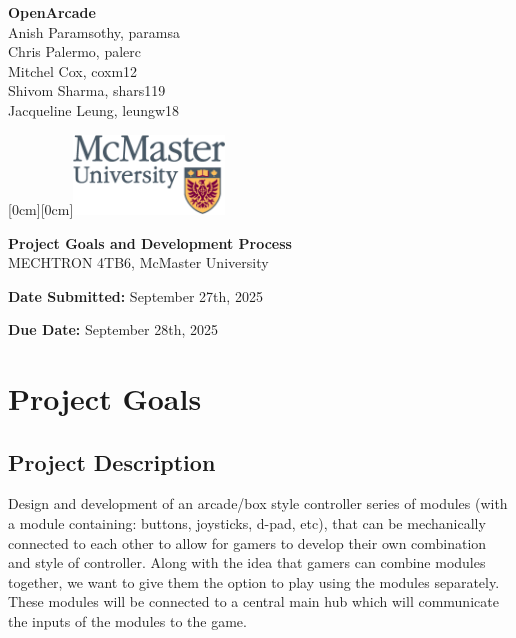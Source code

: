 \documentclass[a4]{article}
\date{\today}
\begin{document}
\begin{titlepage}

    \hspace*{0mm}\textbf{\Large OpenArcade}\\
    \hspace*{0mm} \large Anish Paramsothy, paramsa\\
    \hspace*{0mm} \large Chris Palermo, palerc\\
    \hspace*{0mm} \large Mitchel Cox, coxm12\\
    \hspace*{0mm} \large Shivom Sharma, shars119\\
    \hspace*{0mm} \large Jacqueline Leung, leungw18

    \hspace*{\textwidth} 
    \hspace{-4cm} 
    \vspace{-2cm} 
    \raisebox{1cm}[0cm][0cm]{\includegraphics[width=4cm]{m24-col_png.png}}

    \vspace{7cm} 
    
    
    \begin{center}
        \Huge \textbf{Project Goals and Development Process} \\[1em]
        \Large MECHTRON 4TB6, McMaster University
    \end{center}
    \vspace{7cm}
    
    \hspace*{0mm} \textbf{\large Date Submitted:} September 27th, 2025

    \hspace*{0mm} \textbf{\large Due Date:} September 28th, 2025
\end{titlepage}
\tableofcontents

\clearpage
\section{Project Goals}
\subsection{Project Description}
Design and development of an arcade/box style controller series of modules (with a module containing: buttons, joysticks, d-pad, etc), that can be mechanically 
connected to each other to allow for gamers to develop their own combination and style of controller. Along with the idea that gamers can combine modules together,
we want to give them the option to play using the modules separately. These modules will be connected to a central main hub which will communicate the inputs of the
modules to the game.
\end{document}
